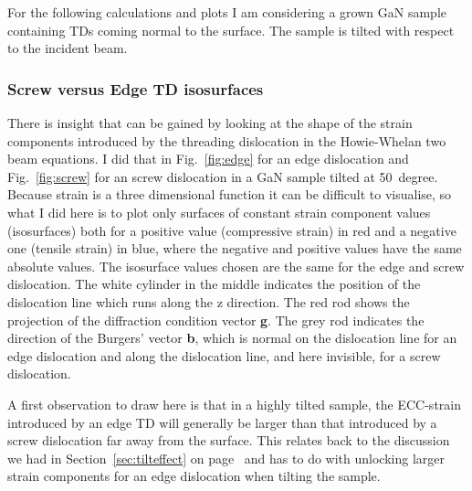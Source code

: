 For the following calculations and plots I am considering a \hkl[001] grown GaN sample containing TDs coming normal to the surface. The sample is tilted with respect to the incident beam.


\subsubsection{Screw versus Edge TD isosurfaces}

There is insight that can be gained by looking at the shape of the strain components introduced by the threading dislocation in the Howie-Whelan two beam equations. I did that in Fig.~\ref{fig:edge} for an edge dislocation and   Fig.~\ref{fig:screw} for an screw dislocation in a GaN sample tilted at \SI{50}{degree}. Because strain is a three dimensional function it can be difficult to visualise, so what I did here is to plot only surfaces of constant strain component values (isosurfaces) both for a positive value (compressive strain) in red and a negative one (tensile strain) in blue, where the negative and positive values have the same absolute values. The isosurface values chosen are the same for the edge and screw dislocation.  The white cylinder in the middle indicates the position of the dislocation line which runs along the z direction. The red rod shows the projection of the diffraction condition vector \textbf{g}. The grey rod indicates the direction of the Burgers' vector \textbf{b}, which is normal on the dislocation line for an edge dislocation and along the dislocation line, and here invisible, for a screw dislocation. 


A first observation to draw here is that in a highly tilted sample, the ECC-strain introduced by an edge TD will generally be larger than that introduced by a screw dislocation far away from the surface. This relates back to the discussion we had in Section~\ref{sec:tilteffect} on page~\pageref{sec:tilteffect} and has to do with unlocking larger strain components for an edge dislocation when tilting the sample. 



